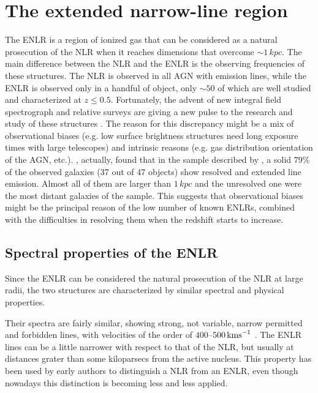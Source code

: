 \documentclass[../main.tex]{subfiles}
\begin{document}
\section{The extended narrow-line region}
\label{sec:ENLR}

The ENLR is a region of ionized gas that can be considered as a natural prosecution of the NLR when it reaches dimensions that overcome $\sim 1\,\si{kpc}$.
The main difference between the NLR and the ENLR is the observing frequencies of these structures.
The NLR is observed in all AGN with emission lines, while the ENLR is observed only in a handful of object,
only $\sim50$ of which are well studied and characterized at $z\le0.5$.
Fortunately, the advent of new integral field spectrograph and relative surveys \citep[e.g. MANGA][]{Bundy15} are giving a new pulse to the research and study of these structures \citep{He18,Husemann14}.
The reason for this discrepancy might be a mix of observational biases (e.g. low surface brightness structures need long exposure times with large telescopes) and intrinsic reasons (e.g. gas distribution orientation of the AGN, etc.).
\citet{Mulchaey96b}, actually, found that in the sample described by \citet{Mulchaey96a}, a solid $79\%$ of the observed galaxies (37 out of 47 objects) show resolved and extended line emission. 
Almost all of them are larger than $1\,\si{kpc}$ and the unresolved one were the most distant galaxies of the sample.
This suggests that observational biases might be the principal reason of the low number of known ENLRs, combined with the difficulties in resolving them when the redshift starts to increase. 


\subsection{Spectral properties of the ENLR}

Since the ENLR can be considered the natural prosecution of the NLR at large radii, the two structures are characterized by similar spectral and physical properties.

Their spectra are fairly similar, showing strong, not variable, narrow permitted and forbidden lines, with velocities of the order of $400$--$500\,\si{\kms}$ \citep{Bennert04}. 
The ENLR lines can be a little narrower with respect to that of the NLR, but usually at distances grater than some kiloparsecs from the active nucleus.
This property has been used by early authors \citep[e.g.][]{Unger87} to distinguish a NLR from an ENLR, even though nowadays this distinction is becoming less and less applied.
\end{document}
